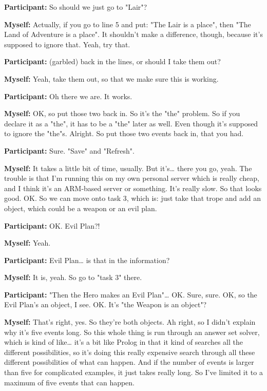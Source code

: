 \documentclass[11pt]{report}
\begin{document}
\begin{linenumbers}
\textbf{Participant:} So should we just go to "Lair"?

\textbf{Myself:} Actually, if you go to line 5 and put: "The Lair is a place", then "The Land of Adventure is a place". It shouldn't make a difference, though, because it's supposed to ignore that. Yeah, try that.

\textbf{Participant:} (garbled) back in the lines, or should I take them out?

\textbf{Myself:} Yeah, take them out, so that we make sure this is working.

\textbf{Participant:} Oh there we are. It works.

\textbf{Myself:} OK, so put those two back in. So it's the "the" problem. So if
you declare it as a "the", it has to be a "the" later as well. Even though it's
supposed to ignore the "the"s. Alright. So put those two events back in, that
you had.

\textbf{Participant:} Sure. "Save" and "Refresh".

\textbf{Myself:} It takes a little bit of time, usually. But it's\ldots{} there you go, yeah. The trouble is that I'm running this on my own personal server which is really cheap, and I think it's an ARM-based server or something. It's really slow. So that looks good. OK. So we can move onto task 3, which is: just take that trope and add an object, which could be a weapon or an evil plan.

\textbf{Participant:} OK. Evil Plan?!

\textbf{Myself:} Yeah.

\textbf{Participant:} Evil Plan\ldots{} is that in the information?

\textbf{Myself:} It is, yeah. So go to "task 3" there.

\textbf{Participant:} "Then the Hero makes an Evil Plan"\ldots{} OK. Sure, sure. OK, so the Evil Plan's an object, I see. OK. It's "the Weapon is an object"?

\textbf{Myself:} That's right, yes. So they're both objects. Ah right, so I
didn't explain why it's five events long. So this whole thing is run through an
answer set solver, which is kind of like\ldots{} it's a bit like Prolog in that
it kind of searches all the different possibilities, so it's doing this really
expensive search through all these different possibilities of what can happen.
And if the number of events is larger than five for complicated examples, it
just takes really long. So I've limited it to a maximum of five events that can
happen.


\end{linenumbers}
\end{document}
